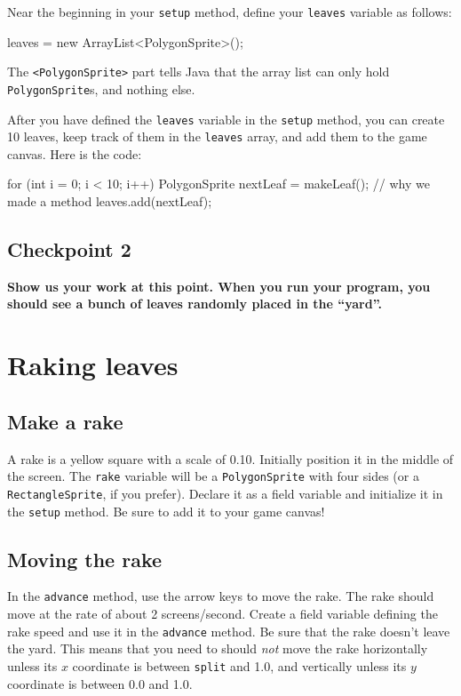 \documentclass[12pt]{article}
\newenvironment{qv}%
  {\quote
   \verbatim}%
  {\endverbatim
   \endquote}
\newcommand{\code}{\texttt}
\begin{document}
Near the beginning in your \code{setup} method,
define your \code{leaves} variable as follows:

\begin{qv}
leaves = new ArrayList<PolygonSprite>();
\end{qv}

The \code{<PolygonSprite>} part tells Java that the array list
can only hold \code{PolygonSprite}s, and nothing else.

After you have defined the \code{leaves} variable in the \code{setup} method,
you can create 10 leaves, keep track of them
in the \code{leaves} array,
and add them to the game canvas.
Here is the code:

\begin{qv}
  for (int i = 0; i < 10; i++) {
    PolygonSprite nextLeaf = makeLeaf(); // why we made a method
    leaves.add(nextLeaf);
  }
\end{qv}

\subsection*{Checkpoint 2}
{\bf
Show us your work at this point.
When you run your program, you should see a bunch
of leaves randomly placed in the ``yard''.
}

\section*{Raking leaves}

\subsection*{Make a rake}
A rake is a yellow square with a
scale of 0.10. Initially position it in the middle of the screen.
The \code{rake} variable will be a \code{PolygonSprite} with four sides
(or a \code{RectangleSprite}, if you prefer).
Declare it as a field variable 
and initialize it in the \code{setup} method.
Be sure to add it to your game canvas!

\subsection*{Moving the rake}
In the \code{advance} method,
use the arrow keys to move the rake.
The rake should move at the rate of about 2 screens/second.
Create a field variable defining the rake speed
and use it in the \code{advance} method.
Be sure that the rake doesn't leave the yard.
This means that you need to should {\em not} move the rake
horizontally unless its $x$ coordinate is between \code{split} and 1.0,
and vertically unless its $y$ coordinate is between 0.0 and 1.0.
\end{document}
